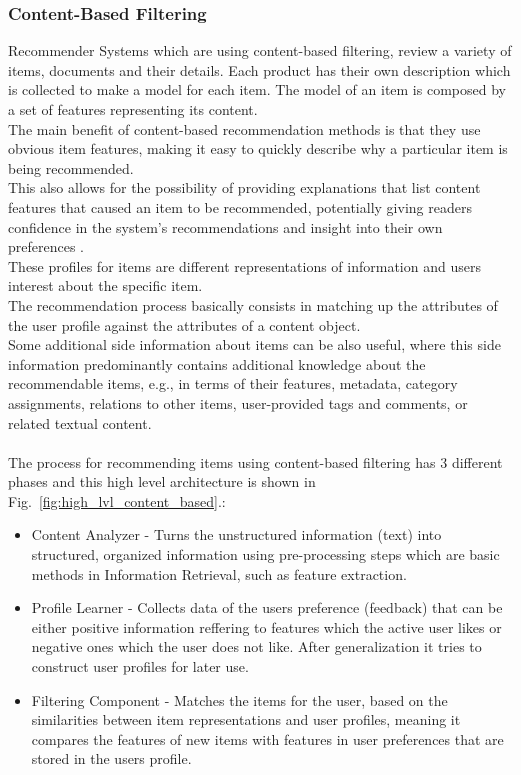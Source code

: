 \documentclass[\myFontSize,a4paper,oneside,english,hidelinks]{article}
\begin{document}
\subsubsection{Content-Based Filtering}
Recommender Systems which are using content-based filtering, review a variety of items, documents and their details. Each product has their own description which is collected to make a model for each item. The model of an item is composed by a set of features representing its content. \\
The main benefit of content-based recommendation methods is that they use obvious item features, making it easy to quickly describe why a particular item is being recommended. \cite{pub.1034486657}\\
This also allows for the possibility of providing explanations that list content features that caused an item to be recommended, potentially giving readers confidence in the system’s recommendations and insight into their own preferences \cite{Mooney2000195}. \\
These profiles for items are different representations of information and users interest about the specific item. \\
The recommendation process basically consists in matching up the attributes of the user profile against the attributes of a content object. \cite{pub.1034486657}\\
%
%
Some additional side information about items can be also useful, where this side information predominantly contains additional knowledge about the recommendable items, e.g., in terms of their features, metadata, category assignments, relations to other items, user-provided tags and comments, or related textual content. \cite{Lops2019239}\\\\
The process for recommending items using content-based filtering has 3 different phases and this high level architecture is shown in Fig.~\ref{fig:high_lvl_content_based}.:
\begin{itemize}
\item Content Analyzer - Turns the unstructured information (text) into structured, organized information using pre-processing steps which are basic methods in Information Retrieval, such as feature extraction.
\item Profile Learner - Collects data of the users preference (feedback) that can be either positive information reffering to features which the active user likes or negative ones which the user does not like. After generalization it tries to construct user profiles for later use.
\item Filtering Component - Matches the items for the user, based on the similarities between item representations and user profiles, meaning it compares the features of new items with features in user preferences that are stored in the users profile. \cite{pub.1034486657}
\end{itemize}
%
\end{document}
